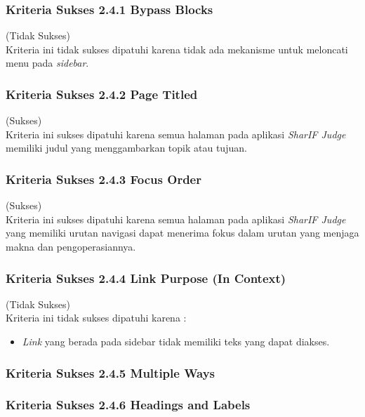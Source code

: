 \subsubsection{Kriteria Sukses 2.4.1 Bypass Blocks}
\label{subsubsec:kepatuhan_kriteria_2.4.1}
(Tidak Sukses) \\

Kriteria ini tidak sukses dipatuhi karena tidak ada mekanisme untuk meloncati menu pada \textit{sidebar}.

\subsubsection{Kriteria Sukses 2.4.2 Page Titled}
\label{subsubsec:kepatuhan_kriteria_2.4.2}
(Sukses) \\

Kriteria ini sukses dipatuhi karena semua halaman pada aplikasi \textit{SharIF Judge} memiliki judul yang menggambarkan topik atau tujuan.

\subsubsection{Kriteria Sukses 2.4.3 Focus Order}
\label{subsubsec:kepatuhan_kriteria_2.4.3}
(Sukses) \\

Kriteria ini sukses dipatuhi karena semua halaman pada aplikasi \textit{SharIF Judge} yang memiliki urutan navigasi dapat menerima fokus dalam urutan yang menjaga makna dan pengoperasiannya.

\subsubsection{Kriteria Sukses 2.4.4 Link Purpose (In Context)}
\label{subsubsec:kepatuhan_kriteria_2.4.4}
(Tidak Sukses) \\

Kriteria ini tidak sukses dipatuhi karena :
\begin{itemize}
	\item \textit{Link} yang berada pada sidebar tidak memiliki teks yang dapat diakses.
\end{itemize}

\subsubsection{Kriteria Sukses 2.4.5 Multiple Ways}
\label{subsubsec:kepatuhan_kriteria_2.4.5}

\subsubsection{Kriteria Sukses 2.4.6 Headings and Labels}
\label{subsubsec:kepatuhan_kriteria_2.4.6}

